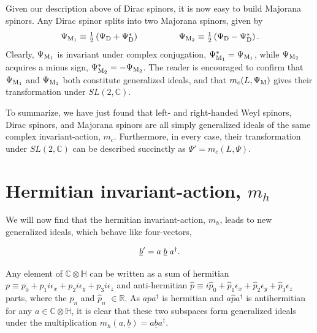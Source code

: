 \documentclass[letterpaper,12pt,titlepage,oneside,final]{book}
\begin{document}
Given our description above of Dirac spinors, it is now easy to build Majorana spinors.  Any Dirac spinor splits into two Majorana spinors, given by 
\begin{equation} \begin{array}{lll}\Psi_{\textup{M}_1} \equiv  \frac{1}{2}\left( \Psi_{\textup{D}} + \Psi_{\textup{D}}^* \right) &\hspace{1cm} & \Psi_{\textup{M}_2} \equiv  \frac{1}{2}\left( \Psi_{\textup{D}} - \Psi_{\textup{D}}^* \right). 
\end{array}\end{equation}
\noindent Clearly, $\Psi_{\textup{M}_1}$ is invariant under complex conjugation, $\Psi_{\textup{M}_1}^* = \Psi_{\textup{M}_1}$, while $\Psi_{\textup{M}_2}$ acquires a minus sign, $\Psi_{\textup{M}_2}^* = -\Psi_{\textup{M}_2}$.  The reader is encouraged to confirm that $\Psi_{\textup{M}_1}$ and $\Psi_{\textup{M}_2}$ both constitute generalized ideals, and that $m_c(L, \Psi_{\textup{M}})$ gives their transformation under $SL(2, \mathbb{C})$.



\vspace{1cm}

To summarize, we have just found that left- and right-handed Weyl spinors, Dirac spinors, and Majorana spinors are all simply  generalized ideals of the same complex invariant-action, $m_c$.  Furthermore, in every case, their transformation under $SL(2, \mathbb{C})$ can be described succinctly as $\Psi ' =m_c(L, \Psi)$.



\section{Hermitian invariant-action, $m_h$ \label{mh}  }

We will now find that the hermitian invariant-action, $m_h$, leads to new generalized ideals, which behave like four-vectors, 

\begin{equation}
\underline{b} ' = a\hspace{1mm} \underline{b}\hspace{1mm} a ^{\dagger}.
\end{equation}

Any element of $\mathbb{C}\otimes\mathbb{H}$ can be written as a sum of hermitian $p\equiv p_0 + p_1i{\epsilon_x} +p_2i{\epsilon_y} + p_3i{\epsilon_z}$ and anti-hermitian $\hat{p}\equiv i\hat{p}_0 + \hat{p}_1{\epsilon_x} +\hat{p}_2{\epsilon_y} + \hat{p}_3{\epsilon_z}$ parts, where the $p_n$ and $\hat{p}_n$ $\in \mathbb{R}$.  %
 As $a p a ^{\dagger}$ is hermitian and $a \hat{p} a ^{\dagger}$ is antihermitian for any $a \in \mathbb{C}\otimes\mathbb{H}$, it is clear that these two subspaces form generalized ideals under the multiplication $m_h( a,\underline{b} ) = a \underline{b} a ^{\dagger}$.
\end{document}
